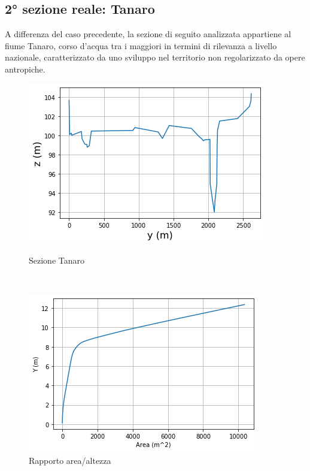 \documentclass[12pt]{article} %
\begin{document}
\subsection{2° sezione reale: Tanaro}

\noindent A differenza del caso precedente, la sezione di seguito analizzata appartiene al fiume Tanaro, corso d’acqua tra i maggiori in termini di rilevanza a livello nazionale, caratterizzato da uno sviluppo nel territorio non regolarizzato da opere antropiche.

\begin{figure}[H]
\begin{minipage}[b]{8.5cm}
\centering
    \includegraphics[width=1 \textwidth]{sezioneta.png}
    \caption{Sezione Tanaro}
    \label{fig:Tanaro_sezione}
\end{minipage}
\ \hspace{2mm} \hspace{3mm} \
\begin{minipage}[b]{8.5cm}
    \centering
    \includegraphics[width=1 \textwidth]{rapporto area altezzata.png}
    \caption{Rapporto area/altezza}
    \label{fig:Tanaro_area/altezza}
\end{minipage}
\end{figure}
\end{document}
